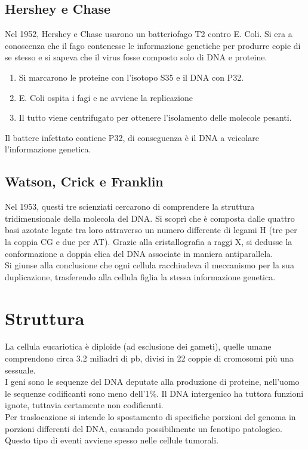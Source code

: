     \subsection{Hershey e Chase}
    Nel 1952, Hershey e Chase usarono un batteriofago T2 contro E. Coli. Si era a conoscenza che il fago contenesse le informazione genetiche per produrre copie di se stesso e si sapeva che il virus fosse composto solo di DNA e proteine. \\
    \begin{enumerate}
        \item Si marcarono le proteine con l'isotopo S35 e il DNA con P32. 
        \item E. Coli ospita i fagi e ne avviene la replicazione
        \item Il tutto viene centrifugato per ottenere l'isolamento delle molecole pesanti.
    \end{enumerate}
    Il battere infettato contiene P32, di conseguenza è il DNA a veicolare l'informazione genetica.
    
    \subsection{Watson, Crick e Franklin}
    Nel 1953, questi tre scienziati cercarono di comprendere la struttura tridimensionale della molecola del DNA. Si scoprì che è composta dalle quattro basi azotate legate tra loro attraverso un numero differente di legami H (tre per la coppia CG e due per AT). 
    Grazie alla cristallografia a raggi X, si dedusse la conformazione a doppia elica del DNA associate in maniera antiparallela.\\
    Si giunse alla conclusione che ogni cellula racchiudeva il meccanismo per la sua duplicazione, trasferendo alla cellula figlia la stessa informazione genetica.
    
\section{Struttura}
    \small
    La cellula eucariotica è diploide (ad esclusione dei gameti), quelle umane comprendono circa 3.2 miliadri di pb, divisi in 22 coppie di cromosomi più una sessuale.\\
    I geni sono le sequenze del DNA deputate alla produzione di proteine, nell'uomo le sequenze codificanti sono meno dell'1\%.
    Il DNA intergenico ha tuttora funzioni ignote, tuttavia certamente non codificanti. \\
    Per traslocazione si intende lo spostamento di specifiche porzioni del genoma in porzioni differenti del DNA, causando possibilmente un fenotipo patologico. Questo tipo di eventi avviene spesso nelle cellule tumorali.
    
